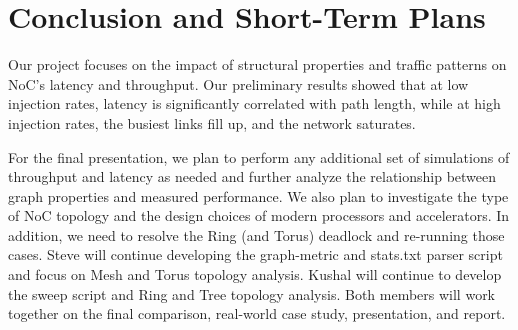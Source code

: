 \documentclass[conference]{IEEEtran}
\begin{document}
\section{Conclusion and Short-Term Plans}

Our project focuses on the impact of structural properties and traffic patterns on NoC's latency and throughput. Our preliminary results showed that at low injection rates, latency is significantly correlated with path length, while at high injection rates, the busiest links fill up, and the network saturates.

For the final presentation, we plan to perform any additional set of simulations of throughput and latency as needed and further analyze the relationship between graph properties and measured performance. We also plan to investigate the type of NoC topology and the design choices of modern processors and accelerators. In addition, we need to resolve the Ring (and Torus) deadlock and re-running those cases. Steve will continue developing the graph-metric and stats.txt parser script and focus on Mesh and Torus topology analysis. Kushal will continue to develop the sweep script and Ring and Tree topology analysis. Both members will work together on the final comparison, real-world case study, presentation, and report.
\end{document}
